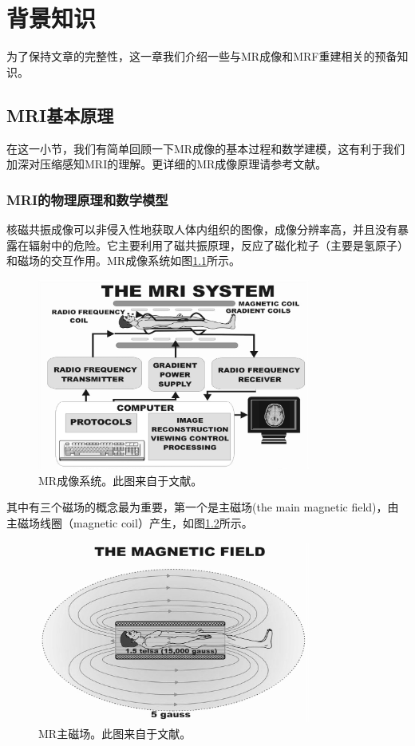 \chapter{背景知识}
\label{chap:pre}
为了保持文章的完整性，这一章我们介绍一些与MR成像和MRF重建相关的预备知识。

\section{MRI基本原理}
\label{sec:mr}
在这一小节，我们有简单回顾一下MR成像的基本过程和数学建模，这有利于我们加深对压缩感知MRI的理解。更详细的MR成像原理请参考文献\cite{mrireview,2009nmr,haacke1999magnetic}。

\subsection{MRI的物理原理和数学模型}
\label{sec:mrimodel}
核磁共振成像可以非侵入性地获取人体内组织的图像，成像分辨率高，并且没有暴露在辐射中的危险。它主要利用了磁共振原理，反应了磁化粒子（主要是氢原子）和磁场的交互作用。MR成像系统如图\ref{fig:system}所示。
\begin{figure}[htbp]
\centering
\includegraphics[width=0.8\textwidth]{img/intro/system.eps}
\caption{MR成像系统。此图来自于文献\cite{sprawls2000magnetic}。}
\label{fig:system}
\end{figure}
其中有三个磁场的概念最为重要，第一个是主磁场(the main magnetic field)，由主磁场线圈（magnetic coil）产生，如图\ref{fig:main}所示。
\begin{figure}[htbp]
\centering
\includegraphics[width=0.8\textwidth]{img/intro/main.eps}
\caption{MR主磁场。此图来自于文献\cite{sprawls2000magnetic}。}
\label{fig:main}
\end{figure}
